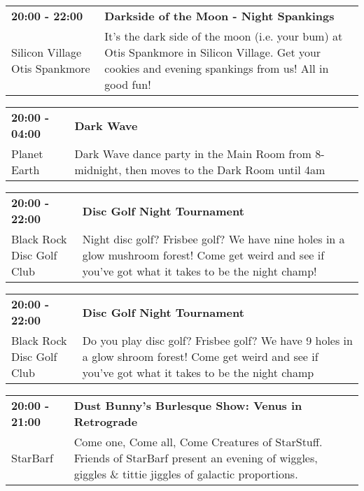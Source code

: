 \begin{tabular}{ p{1in} p{2.2in} }
    \textbf{20:00 - 22:00} & \textbf{Darkside of the Moon - Night Spankings} \\
    Silicon Village \newline Otis Spankmore & It's the dark side of the moon (i.e. your bum) at Otis Spankmore in Silicon Village. Get your cookies and evening spankings from us! All in good fun! \\
    \hline 
\end{tabular}
    
\begin{tabular}{ p{1in} p{2.2in} }
    \textbf{20:00 - 04:00} & \textbf{Dark Wave} \\
    Planet Earth \newline  & Dark Wave dance party in the Main Room from 8-midnight, then moves to the Dark Room until 4am \\
    \hline 
\end{tabular}
    
\begin{tabular}{ p{1in} p{2.2in} }
    \textbf{20:00 - 22:00} & \textbf{Disc Golf Night Tournament} \\
    Black Rock Disc Golf Club \newline  & Night disc golf? Frisbee golf? We have nine holes in a glow mushroom forest! Come get weird and see if you've got what it takes to be the night champ! \\
    \hline 
\end{tabular}
    
\begin{tabular}{ p{1in} p{2.2in} }
    \textbf{20:00 - 22:00} & \textbf{Disc Golf Night Tournament} \\
    Black Rock Disc Golf Club \newline  & Do you play disc golf? Frisbee golf? We have 9 holes in a glow shroom forest! Come get weird and see if you've got what it takes to be the night champ \\
    \hline 
\end{tabular}
    
\begin{tabular}{ p{1in} p{2.2in} }
    \textbf{20:00 - 21:00} & \textbf{Dust Bunny's Burlesque Show: Venus in Retrograde} \\
    StarBarf \newline  & Come one, Come all, Come Creatures of StarStuff. Friends of StarBarf present an evening of wiggles, giggles \& tittie jiggles of galactic proportions. \\
    \hline 
\end{tabular}
    
